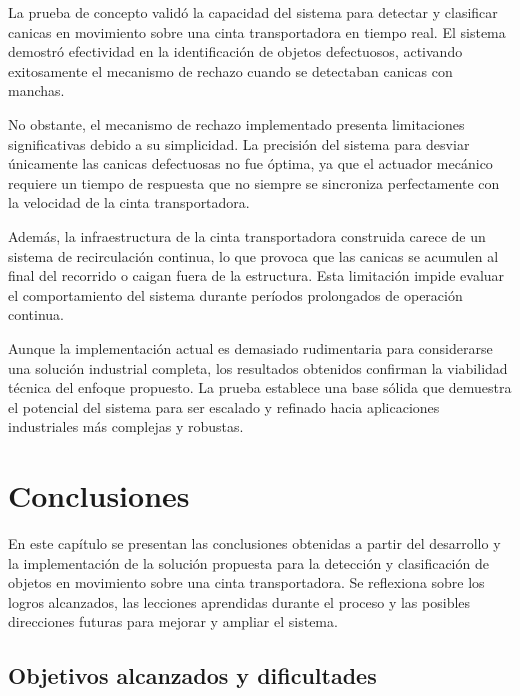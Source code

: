 \documentclass[11pt,spanish,listoffigures,listoftables]{tfgetsinf}
\begin{document}
La prueba de concepto validó la capacidad del sistema para detectar y clasificar canicas en movimiento sobre una cinta transportadora en tiempo real. El sistema demostró efectividad en la identificación de objetos defectuosos, activando exitosamente el mecanismo de rechazo cuando se detectaban canicas con manchas.

No obstante, el mecanismo de rechazo implementado presenta limitaciones significativas debido a su simplicidad. La precisión del sistema para desviar únicamente las canicas defectuosas no fue óptima, ya que el actuador mecánico requiere un tiempo de respuesta que no siempre se sincroniza perfectamente con la velocidad de la cinta transportadora.

Además, la infraestructura de la cinta transportadora construida carece de un sistema de recirculación continua, lo que provoca que las canicas se acumulen al final del recorrido o caigan fuera de la estructura. Esta limitación impide evaluar el comportamiento del sistema durante períodos prolongados de operación continua.

Aunque la implementación actual es demasiado rudimentaria para considerarse una solución industrial completa, los resultados obtenidos confirman la viabilidad técnica del enfoque propuesto. La prueba establece una base sólida que demuestra el potencial del sistema para ser escalado y refinado hacia aplicaciones industriales más complejas y robustas.




\chapter{Conclusiones} \label{chap:conclusiones}

En este capítulo se presentan las conclusiones obtenidas a partir del desarrollo y la implementación de la solución propuesta para la detección y clasificación de objetos en movimiento sobre una cinta transportadora. Se reflexiona sobre los logros alcanzados, las lecciones aprendidas durante el proceso y las posibles direcciones futuras para mejorar y ampliar el sistema.

\section{Objetivos alcanzados y dificultades}
\end{document}
